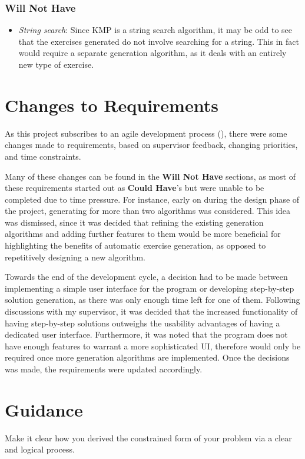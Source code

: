 \documentclass{l4proj}
\begin{document}
\subsubsection{Will Not Have}
\begin{itemize}
	\item
	\emph{String search}: Since KMP is a string search algorithm, it may be odd to see that the exercises generated do not involve searching for a string. This in fact would require a separate generation algorithm, as it deals with an entirely new type of exercise.
\end{itemize}
\section{Changes to Requirements}

As this project subscribes to an agile development process (\cite{}), there were some changes made to requirements, based on supervisor feedback, changing priorities, and time constraints.

Many of these changes can be found in the \textbf{Will Not Have} sections, as most of these requirements started out as \textbf{Could Have}'s but were unable to be completed due to time pressure. For instance, early on during the design phase of the project, generating for more than two algorithms was considered. This idea was dismissed, since it was decided that refining the existing generation algorithms and adding further features to them would be more beneficial for highlighting the benefits of automatic exercise generation, as opposed to repetitively designing a new algorithm. 

Towards the end of the development cycle, a decision had to be made between implementing a simple user interface for the program or developing step-by-step solution generation, as there was only enough time left for one of them. Following discussions with my supervisor, it was decided that the increased functionality of having step-by-step solutions outweighs the usability advantages of having a dedicated user interface. Furthermore, it was noted that the program does not have enough features to warrant a more sophisticated UI, therefore would only be required once more generation algorithms are implemented. Once the decisions was made, the requirements were updated accordingly.

\section{Guidance}
Make it clear how you derived the constrained form of your problem via a clear and logical process. 
\end{document}
